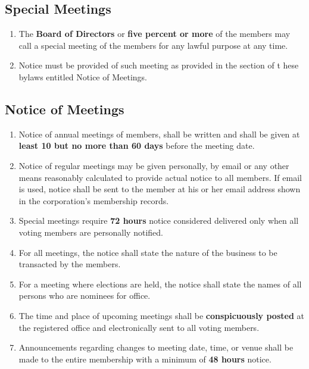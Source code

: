 \documentclass{article}
\begin{document}
\subsection{Special Meetings}
\begin{enumerate}
    \item The \textbf{Board of Directors} or \textbf{five percent or more} of the
    members may call a special meeting of the members for any lawful purpose at
    any time.
    \item Notice must be provided of such meeting as provided in the section of t
    hese bylaws entitled Notice of Meetings.
\end{enumerate}
\subsection{Notice of Meetings}
\begin{enumerate}
    \item Notice of annual meetings of members, shall be written and shall be
    given at \textbf{least 10 but no more than 60 days} before the meeting date.
    \item Notice of regular meetings may be given personally, by email or any
    other means reasonably calculated to provide actual notice to all members.
    If email is used, notice shall be sent to the member at his or her email
    address shown in the corporation’s membership records.
    \item Special meetings require \textbf{72 hours} notice considered delivered only
    when all voting members are personally notified.
    \item For all meetings, the notice shall state the nature of the business to
    be transacted by the members.
    \item For a meeting where elections are held, the notice shall state the
    names of all persons who are nominees for office.
    \item The time and place of upcoming meetings shall be \textbf{conspicuously posted}
    at the registered office and electronically sent to all voting members.
    \item Announcements regarding changes to meeting date, time, or venue shall
    be made to the entire membership with a minimum of \textbf{48 hours} notice.
\end{enumerate}
\end{document}
